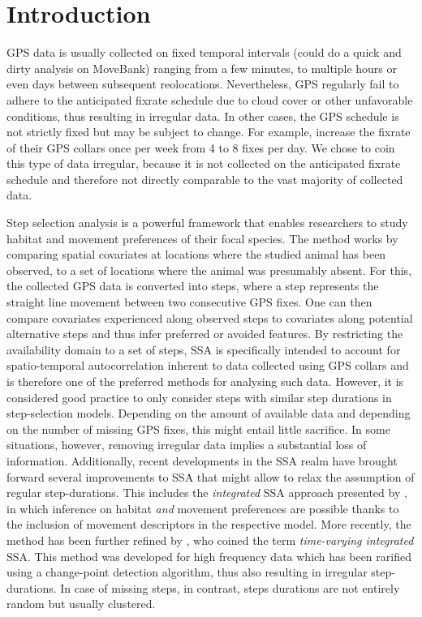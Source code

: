 \documentclass[abstract=on,10pt,a4paper,bibliography=totocnumbered]{article}
\begin{document}
\section{Introduction}
GPS data is usually collected on fixed temporal intervals (could do a quick and
dirty analysis on MoveBank) ranging from a few minutes, to multiple hours or
even days between subsequent reolocations. Nevertheless, GPS regularly fail to
adhere to the anticipated fixrate schedule due to cloud cover or other
unfavorable conditions, thus resulting in irregular data. In other cases, the
GPS schedule is not strictly fixed but may be subject to change. For example,
\cite{Cozzi.2020} increase the fixrate of their GPS collars once per week from 4
to 8 fixes per day. We chose to coin this type of data irregular, because it is
not collected on the anticipated fixrate schedule and therefore not directly
comparable to the vast majority of collected data.

Step selection analysis is a powerful framework that enables researchers to
study habitat and movement preferences of their focal species. The method works
by comparing spatial covariates at locations where the studied animal has been
observed, to a set of locations where the animal was presumably absent. For
this, the collected GPS data is converted into steps, where a step represents
the straight line movement between two consecutive GPS fixes. One can then
compare covariates experienced along observed steps to covariates along
potential alternative steps and thus infer preferred or avoided features. By
restricting the availability domain to a set of steps, SSA is specifically
intended to account for spatio-temporal autocorrelation inherent to data
collected using GPS collars and is therefore one of the preferred methods for
analysing such data. However, it is considered good practice to only consider
steps with similar step durations in step-selection models. Depending on the
amount of available data and depending on the number of missing GPS fixes, this
might entail little sacrifice. In some situations, however, removing irregular
data implies a substantial loss of information. Additionally, recent
developments in the SSA realm have brought forward several improvements to SSA
that might allow to relax the assumption of regular step-durations. This
includes the \textit{integrated} SSA approach presented by \citep{Avgar.2016},
in which inference on habitat \textit{and} movement preferences are possible
thanks to the inclusion of movement descriptors in the respective model. More
recently, the method has been further refined by \citep{Munden.2021}, who coined
the term \textit{time-varying integrated} SSA. This method was developed for
high frequency data which has been rarified using a change-point detection
algorithm, thus also resulting in irregular step-durations. In case of missing
steps, in contrast, steps durations are not entirely random but usually
clustered.
\end{document}
